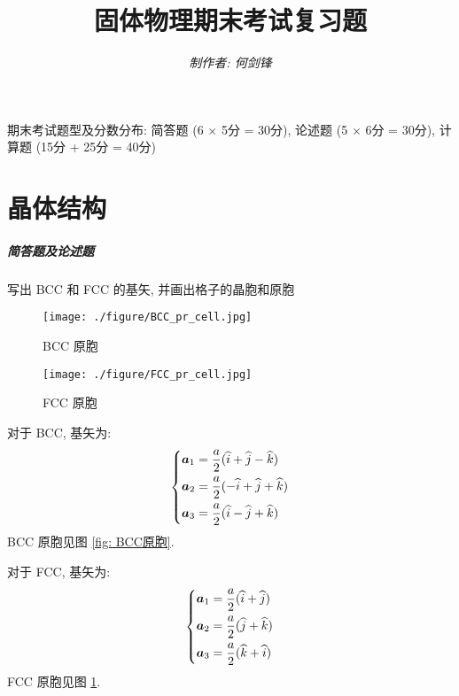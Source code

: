 \documentclass[UTF8]{ctexart}
\title{\bfseries 固体物理期末考试复习题}
\author{\slshape 制作者: 何剑锋}
\date{}
\newenvironment{Answer}{}{}
\begin{document}
\maketitle

\hspace*{2em}期末考试题型及分数分布: 简答题 (6 $\times$ 5分 = 30分), 论述题 (5 $\times$ 6分 = 30分), 计算题 (15分 + 25分 = 40分)

\section{晶体结构}
    \subparagraph{简答题及论述题}
        \begin{Question}
            \item 写出 BCC 和 FCC 的基矢, 并画出格子的晶胞和原胞

\begin{Answer}
    \begin{Solve}[Solve:]
        \begin{figure}
            \centering
            \parbox[t]{.49\textwidth}{
                \centering
                \texttt{[image: ./figure/BCC\_pr\_cell.jpg]}
                \caption{BCC 原胞}\label{fig: BCC原胞}
            }
            \parbox[t]{.49\textwidth}{
                \centering
                \texttt{[image: ./figure/FCC\_pr\_cell.jpg]}
                \caption{FCC 原胞}\label{fig: FCC原胞}
            }
        \end{figure}

        \hspace*{2em}对于 BCC, 基矢为:
            \begin{equation*}
                \begin{dcases}
                    \bm{a}_1 = \dfrac{a}{2} (\widehat{i} + \widehat{j} - \widehat{k})  \\
                    \bm{a}_2 = \dfrac{a}{2} (-\widehat{i} + \widehat{j} + \widehat{k}) \\
                    \bm{a}_3 = \dfrac{a}{2} (\widehat{i} - \widehat{j} + \widehat{k})
                \end{dcases}
            \end{equation*}
        BCC 原胞见图 \ref{fig: BCC原胞}.

        \hspace*{2em}对于 FCC, 基矢为:
            \begin{equation*}
                \begin{dcases}
                    \bm{a}_1 = \dfrac{a}{2} (\widehat{i} + \widehat{j}) \\
                    \bm{a}_2 = \dfrac{a}{2} (\widehat{j} + \widehat{k}) \\
                    \bm{a}_3 = \dfrac{a}{2} (\widehat{k} + \widehat{i})
                \end{dcases}
            \end{equation*}
        FCC 原胞见图 \ref{fig: FCC原胞}.
    \end{Solve}
\end{Answer}


\end{Question}
\end{document}
